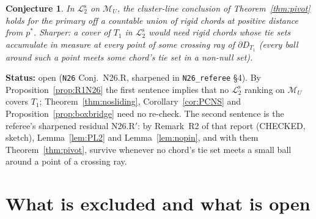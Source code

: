 \documentclass[11pt]{article}
\newtheorem{conjecture}[theorem]{Conjecture}
\theoremstyle{definition}
\theoremstyle{remark}
\newcommand{\M}{\mathcal M}
\newcommand{\src}[1]{\texttt{#1}}
\newcommand{\status}[1]{\par\smallskip\noindent\textbf{Status:} #1\par\smallskip}
\newcommand{\Ltwo}{\mathcal L_2^{\mathrm s}}
\begin{document}
\begin{conjecture}\label{conj:N26R}
In $\Ltwo$ on $\M_U$, the cluster-line conclusion of Theorem~\ref{thm:pivot} holds for the primary off a countable union of rigid chords at positive distance from $p^*$. Sharper: a cover of $T_1$ in $\Ltwo$ would need rigid chords whose tie sets accumulate in measure at every point of some crossing ray of $\partial D_{T_1}$ (every ball around such a point meets some chord's tie set in a non-null set).
\end{conjecture}
\status{open (\src{N26} Conj.~N26.R, sharpened in \src{N26\_referee} \S4). By Proposition~\ref{prop:R1N26} the first sentence implies that no $\Ltwo$ ranking on $\M_U$ covers $T_1$; Theorem~\ref{thm:nosliding}, Corollary~\ref{cor:PCNS} and Proposition~\ref{prop:boxbridge} need no re-check. The second sentence is the referee's sharpened residual N26.R$'$: by Remark~R2 of that report (CHECKED, sketch), Lemma~\ref{lem:PL2} and Lemma~\ref{lem:nopin}, and with them Theorem~\ref{thm:pivot}, survive whenever no chord's tie set meets a small ball around a point of a crossing ray.}

\section{What is excluded and what is open}\label{sec:open}
\end{document}
